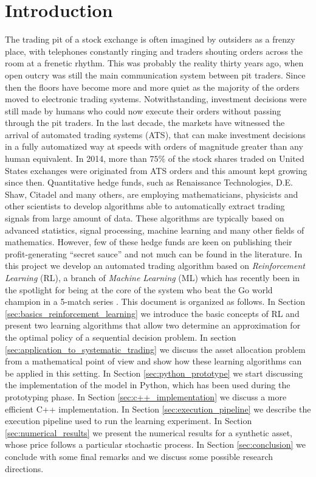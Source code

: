 \section{Introduction}
\label{sec:introduction}

The trading pit of a stock exchange is often imagined by outsiders as a frenzy place, with telephones constantly ringing and traders shouting orders across the room at a frenetic rhythm. This was probably the reality thirty years ago, when open outcry was still the main communication system between pit traders. Since then the floors have become more and more quiet as the majority of the orders moved to electronic trading systems. Notwithstanding, investment decisions were still made by humans who could now execute their orders without passing through the pit traders. In the last decade, the markets have witnessed the arrival of automated trading systems (ATS), that can make investment decisions in a fully automatized way at speeds with orders of magnitude greater than any human equivalent. In 2014, more than $75\%$ of the stock shares traded on United States exchanges were originated from ATS orders and this amount kept growing since then. Quantitative hedge funds, such as Renaissance Technologies, D.E. Shaw, Citadel and many others, are employing mathematicians, physicists and other scientists to develop algorithms able to automatically extract trading signals from large amount of data. These algorithms are typically based on advanced statistics, signal processing, machine learning and many other fields of mathematics. However, few of these hedge funds are keen on publishing their profit-generating ``secret sauce'' and not much can be found in the literature. In this project we develop an automated trading algorithm based on \emph{Reinforcement Learning} (RL), a branch of \emph{Machine Learning} (ML) which has recently been in the spotlight for being at the core of the system who beat the Go world champion in a 5-match series \cite{silver2016mastering}. This document is organized as follows. In Section \ref{sec:basics_reinforcement_learning} we introduce the basic concepts of RL and present two learning algorithms that allow two determine an approximation for the optimal policy of a sequential decision problem. In section \ref{sec:application_to_systematic_trading} we discuss the asset allocation problem from a mathematical point of view and show how these learning algorithms can be applied in this setting. In Section \ref{sec:python_prototype} we start discussing the implementation of the model in Python, which has been used during the prototyping phase. In Section \ref{sec:c++_implementation} we discuss a more efficient C++ implementation. 
In Section \ref{sec:execution_pipeline} we describe the execution pipeline used to run the learning experiment. In Section \ref{sec:numerical_results} we present the numerical results for a synthetic asset, whose price follows a particular stochastic process. In Section \ref{sec:conclusion} we conclude with some final remarks and we discuss some possible research directions. 
